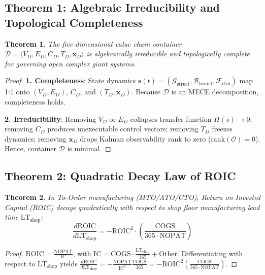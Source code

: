 \documentclass[11pt,a4paper]{article}
\newtheorem{theorem}{Theorem}[section]
\begin{document}
\subsection*{Theorem 1: Algebraic Irreducibility and Topological Completeness}
\begin{theorem}
The five-dimensional value chain container $\mathcal{D} = \langle V_D, E_D, C_D, T_D, \mathbf{x}_D \rangle$ is algebraically irreducible and topologically complete for governing open complex giant systems.
\end{theorem}
\begin{proof}
\textbf{1. Completeness}: State dynamics $\mathbf{s}(t) = (\mathcal{G}_{\text{struct}}, \mathcal{B}_{\text{bound}}, \mathcal{F}_{\text{dyn}})$ map 1:1 onto $(V_D, E_D)$, $C_D$, and $(T_D, \mathbf{x}_D)$. Because $\mathcal{D}$ is an MECE decomposition, completeness holds.

\textbf{2. Irreducibility}: Removing $V_D$ or $E_D$ collapses transfer function $H(s) \to 0$; removing $C_D$ produces unexecutable control vectors; removing $T_D$ freezes dynamics; removing $\mathbf{x}_D$ drops Kalman observability rank to zero ($\text{rank}(\mathcal{O}) = 0$). Hence, container $\mathcal{D}$ is minimal.
\end{proof}

\subsection*{Theorem 2: Quadratic Decay Law of ROIC}
\begin{theorem}
In To-Order manufacturing (MTO/ATO/CTO), Return on Invested Capital (ROIC) decays quadratically with respect to shop floor manufacturing lead time $\text{LT}_{\mathrm{shop}}$:
\begin{equation}
    \frac{d\text{ROIC}}{d\text{LT}_{\mathrm{shop}}} = - \text{ROIC}^2 \cdot \left( \frac{\text{COGS}}{365 \cdot \text{NOPAT}} \right)
\end{equation}
\end{theorem}
\begin{proof}
$\text{ROIC} = \frac{\text{NOPAT}}{\text{IC}}$, with $\text{IC} = \text{COGS} \cdot \frac{\text{LT}_{\text{shop}}}{365} + \text{Other}$. Differentiating with respect to $\text{LT}_{\text{shop}}$ yields $\frac{d\text{ROIC}}{d\text{LT}_{\text{shop}}} = - \frac{\text{NOPAT}}{\text{IC}^2} \frac{\text{COGS}}{365} = - \text{ROIC}^2 \left( \frac{\text{COGS}}{365 \cdot \text{NOPAT}} \right)$.
\end{proof}
\end{document}
